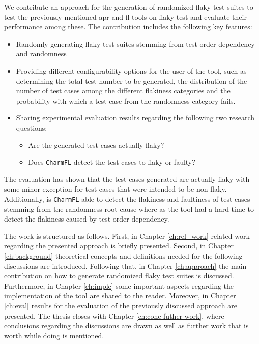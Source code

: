 \documentclass[
fancyheadings, %
%
%
]{stsreprt}
\begin{document}
We contribute an approach for the generation of randomized flaky test suites to test the previously mentioned \acrshort{apr} and \acrshort{fl} tools on flaky test and evaluate their performance among these. 
The contribution includes the following key features:
\begin{itemize}
    \item Randomly generating flaky test suites stemming from test order dependency and randomness
    \item Providing different configurability options for the user of the tool, such as determining the total test number to be generated, the distribution of the number of test cases among the different flakiness categories and the probability with which a test case from the randomness category fails. 
    \item Sharing experimental evaluation results regarding the following two research questions:
    \begin{itemize}
        \item Are the generated test cases actually flaky?
        \item Does \texttt{CharmFL} detect the test cases to flaky or faulty?
    \end{itemize}
\end{itemize} \par
The evaluation has shown that the test cases generated are actually flaky with some minor exception for test cases that were intended to be non-flaky. 
Additionally, is \texttt{CharmFL} able to detect the flakiness and faultiness of test cases stemming from the randomness root cause where as the tool had a hard time to detect the flakiness caused by test order dependency. \par

The work is structured as follows. 
First, in Chapter \ref{ch:rel_work} related work regarding the presented approach is briefly presented. 
Second, in Chapter \ref{ch:background} theoretical concepts and definitions needed for the following discussions are introduced. 
Following that, in Chapter \ref{ch:approach} the main contribution on how to generate randomized flaky test suites is discussed. 
Furthermore, in Chapter \ref{ch:imple} some important aspects regarding the implementation of the tool are shared to the reader. 
Moreover, in Chapter \ref{ch:eval} results for the evaluation of the previously discussed approach are presented.
The thesis closes with Chapter \ref{ch:conc-futher-work}, where conclusions regarding the discussions are drawn as well as further work that is worth while doing is mentioned. 
\end{document}
